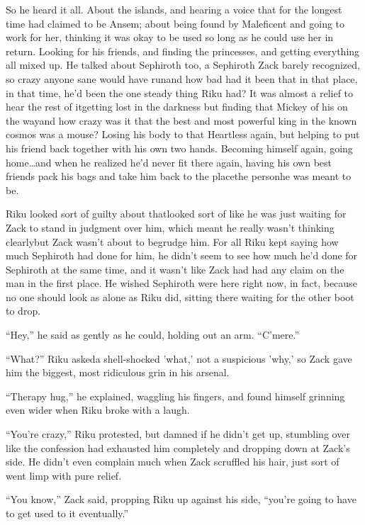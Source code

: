 So he heard it all. About the islands, and hearing a voice that for the longest time had claimed to be Ansem; about being found by Maleficent and going to work for her, thinking it was okay to be used so long as he could use her in return. Looking for his friends, and finding the princesses, and getting everything all mixed up. He talked about Sephiroth too, a Sephiroth Zack barely recognized, so crazy anyone sane would have run\textemdash and how bad had it been that in that place, in that time, he'd been the one steady thing Riku had? It was almost a relief to hear the rest of it\textemdash getting lost in the darkness but finding that Mickey of his on the way\textemdash and how crazy was it that the best and most powerful king in the known cosmos was a mouse? Losing his body to that Heartless again, but helping to put his friend back together with his own two hands. Becoming himself again, going home\ldots and when he realized he'd never fit there again, having his own best friends pack his bags and take him back to the place\textemdash the person\textemdash he was meant to be.

Riku looked sort of guilty about that\textemdash looked sort of like he was just waiting for Zack to stand in judgment over him, which meant he really wasn't thinking clearly\textemdash but Zack wasn't about to begrudge him. For all Riku kept saying how much Sephiroth had done for him, he didn't seem to see how much he'd done for Sephiroth at the same time, and it wasn't like Zack had had any claim on the man in the first place. He wished Sephiroth were here right now, in fact, because no one should look as alone as Riku did, sitting there waiting for the other boot to drop.

``Hey,'' he said as gently as he could, holding out an arm. ``C'mere.''

``What?'' Riku asked\textemdash a shell-shocked 'what,' not a suspicious 'why,' so Zack gave him the biggest, most ridiculous grin in his arsenal.

``Therapy hug,'' he explained, waggling his fingers, and found himself grinning even wider when Riku broke with a laugh.

``You're crazy,'' Riku protested, but damned if he didn't get up, stumbling over like the confession had exhausted him completely and dropping down at Zack's side. He didn't even complain much when Zack scruffled his hair, just sort of went limp with pure relief.

``You know,'' Zack said, propping Riku up against his side, ``you're going to have to get used to it eventually.''

